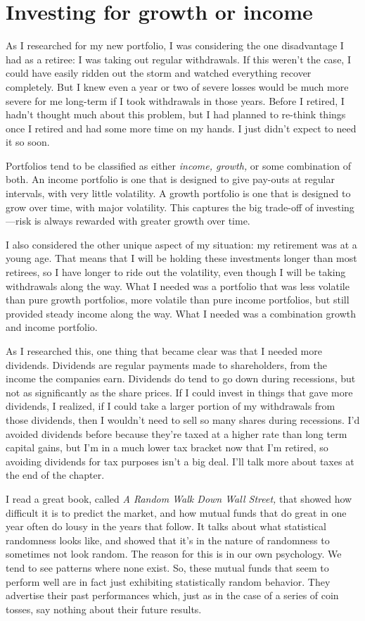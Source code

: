 \section{Investing for growth or income}
As I researched for my new portfolio, I was considering the one disadvantage I had as a retiree: I was taking out regular withdrawals. If this weren't the case, I could have easily ridden out the storm and watched everything recover completely. But I knew even a year or two of severe losses would be much more severe for me long-term if I took withdrawals in those years. Before I retired, I hadn't thought much about this problem, but I had planned to re-think things once I retired and had some more time on my hands. I just didn't expect to need it so soon.

Portfolios tend to be classified as either \emph{income, growth,} or some combination of both. An income portfolio is one that is designed to give pay-outs at regular intervals, with very little volatility. A growth portfolio is one that is designed to grow over time, with major volatility. This captures the big trade-off of investing—risk is always rewarded with greater growth over time.

I also considered the other unique aspect of my situation: my retirement was at a young age. That means that I will be holding these investments longer than most retirees, so I have longer to ride out the volatility, even though I will be taking withdrawals along the way. What I needed was a portfolio that was less volatile than pure growth portfolios, more volatile than pure income portfolios, but still provided steady income along the way. What I needed was a combination growth and income portfolio.

As I researched this, one thing that became clear was that I needed more dividends. Dividends are regular payments made to shareholders, from the income the companies earn. Dividends do tend to go down during recessions, but not as significantly as the share prices. If I could invest in things that gave more dividends, I realized, if I could take a larger portion of my withdrawals from those dividends, then I wouldn't need to sell so many shares during recessions. I'd avoided dividends before because they're taxed at a higher rate than long term capital gains, but I'm in a much lower tax bracket now that I'm retired, so avoiding dividends for tax purposes isn't a big deal. I'll talk more about taxes at the end of the chapter.

I read a great book, called \emph{A Random Walk Down Wall Street,} that showed how difficult it is to predict the market, and how mutual funds that do great in one year often do lousy in the years that follow. It talks about what statistical randomness looks like, and showed that it's in the nature of randomness to sometimes not look random. The reason for this is in our own psychology. We tend to see patterns where none exist. So, these mutual funds that seem to perform well are in fact just exhibiting statistically random behavior. They advertise their past performances which, just as in the case of a series of coin tosses, say nothing about their future results.

